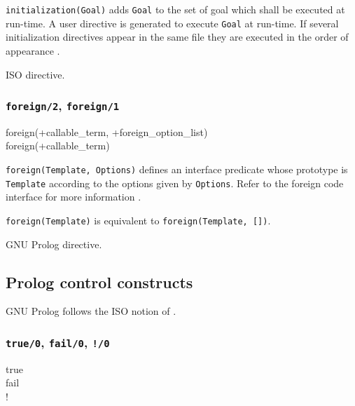 \Description

\texttt{initialization(Goal)} adds \texttt{Goal} to the set of goal which
shall be executed at run-time. A user directive is generated to execute
\texttt{Goal} at run-time. If several initialization directives appear in
the same file they are executed in the order of appearance
.

\Portability

ISO directive.

\subsubsection{\texttt{foreign/2},
               \texttt{foreign/1}}
\label{foreign/2}

\begin{TemplatesOneCol}
foreign(+callable\_term, +foreign\_option\_list)\\
foreign(+callable\_term)

\end{TemplatesOneCol}

\Description

\texttt{foreign(Template, Options)} defines an interface predicate whose
prototype is \texttt{Template} according to the options given by
\texttt{Options}. Refer to the foreign code interface for more information
.

\texttt{foreign(Template)} is equivalent to \texttt{foreign(Template, [])}.

\Portability

GNU Prolog directive.

\subsection{Prolog control constructs}
\label{control-construct}

GNU Prolog follows the ISO notion of . 

\subsubsection{\texttt{true/0},
               \texttt{fail/0},
               \texttt{!/0}}
\label{true/0}

\begin{TemplatesOneCol}
true\\
fail\\
!

\end{TemplatesOneCol}

